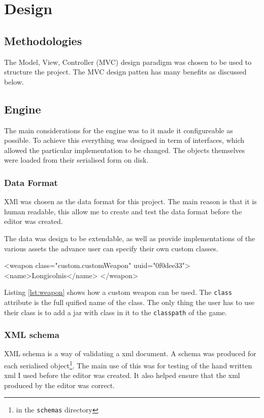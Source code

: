 \section{Design}

\subsection{Methodologies}
\label{sub:methodologies}
The Model, View, Controller (MVC) design paradigm was chosen to be used to structure the project. The MVC design patten has many benefits as discussed below.  


\subsection{Engine}
The main considerations  for the engine was to it made it configureable as possible. To achieve this everything was designed in term of interfaces, which allowed the particular implementation to be changed. The objects themselves were loaded from their serialised form on disk. 

\subsubsection{Data Format}
XMl was chosen as the data format for this project. The main reason is that it is human readable, this allow me to create and test the data format before the editor was created.

The data was design to be extendable, as well as provide implementations of the various assets the advance user can specify their own custom classes.
\begin{lst:weapon}[caption=Example of Custom weapon, label=lst:weapon]
<weapon class="custom.customWeapon" uuid="0f0dee33">
	<name>Longicolnis</name>
</weapon>
\end{lst:weapon}
Listing \ref{lst:weapon} shows how a custom weapon can be used. The \texttt{class} attribute is  the full quified name of the class. The only thing the user has to use their class is to add a jar with class in it to the \texttt{classpath} of the game. 

\subsubsection{XML schema}

XML schema is a way of validating a  xml document. A schema was produced for each serialised object\footnote{in the \texttt{schemas} directory}. 
The main use of this was for testing of the hand written xml I used before the editor was created. It also helped ensure that the xml produced by the editor was correct.  

